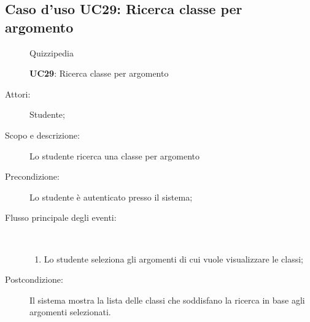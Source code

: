 \subsection{Caso d'uso UC29: Ricerca classe per argomento}
	\begin{figure}[H]
		\centering
		\begin{resizedtikzpicture}{\textwidth}
		\begin{umlsystem}[x=0, fill=lightgray!20]{Quizzipedia}
		\end{umlsystem}
		\end{resizedtikzpicture}
		\caption{\textbf{UC29}: Ricerca classe per argomento}
		\label{UC29}
	\end{figure}
\begin{description}
\item[Attori:] Studente;
\item[Scopo e descrizione:] Lo studente ricerca una classe per argomento
      \item[Precondizione:] Lo studente è autenticato presso il sistema;

        \item[Flusso principale degli eventi:] \ 
 \begin{enumerate}
          \item Lo studente seleziona gli argomenti di cui vuole visualizzare le classi;

      \end{enumerate}
    \item[Postcondizione:] Il sistema mostra la lista delle classi che soddisfano la ricerca in base agli argomenti selezionati.
  \end{description}
\hypertarget{UC30}{}
